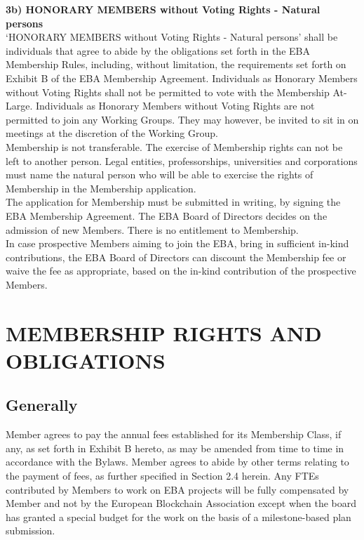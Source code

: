\documentclass{article}
\begin{document}
\textbf{3b) HONORARY MEMBERS without Voting Rights - Natural persons} \\

‘HONORARY MEMBERS without Voting Rights - Natural persons’ shall be individuals that agree to abide by the obligations set forth in the EBA Membership Rules, including, without limitation, the requirements set forth on Exhibit B of the EBA Membership Agreement. 
Individuals as Honorary  Members without Voting Rights shall not be permitted to vote with the Membership At-Large. Individuals as Honorary Members without Voting Rights are not permitted to join any Working Groups. 
They may however, be invited to sit in on meetings at the discretion of the Working Group. \\

Membership is not transferable. 
The exercise of Membership rights can not be left to another person. 
Legal entities, professorships, universities and corporations must name the natural person who will be able to exercise the rights of Membership in the Membership application. \\ 

The application for Membership must be submitted in writing, by signing the EBA Membership Agreement. 
The EBA Board of Directors decides on the admission of new Members. There is no entitlement to Membership. \\

In case prospective Members aiming to join the EBA, bring in sufficient in-kind contributions, the EBA Board of Directors can discount the Membership fee or waive the fee as appropriate, based on the in-kind contribution of the prospective Members.

\section{MEMBERSHIP RIGHTS AND OBLIGATIONS}

\subsection{Generally}

Member agrees to pay the annual fees established for its Membership Class, if any, as set forth in Exhibit B hereto, as may be amended from time to time in accordance with the Bylaws. 
Member agrees to abide by other terms relating to the payment of fees, as further specified in Section 2.4 herein. 
Any FTEs contributed by Members to work on EBA projects will be fully compensated by Member and not by the European Blockchain Association except when the board has granted a special budget for the work on the basis of a milestone-based plan submission.
\end{document}
